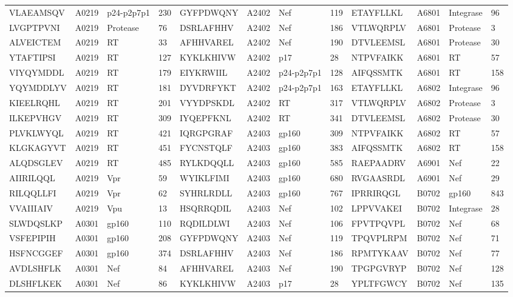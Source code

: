 \begin{table}[htp]
\begin{center}
\begin{sideways}
{\begin{tabulary}{1.5\textwidth}{|l|l|l|l|l|l|l|l|l|l|l|l|}
VLAEAMSQV & A0219 & p24-p2p7p1 & 230 & GYFPDWQNY & A2402 & Nef & 119 & ETAYFLLKL & A6801 & Integrase & 96 \\
LVGPTPVNI & A0219 & Protease & 76 & DSRLAFHHV & A2402 & Nef & 186 & VTLWQRPLV & A6801 & Protease & 3 \\
ALVEICTEM & A0219 & RT & 33 & AFHHVAREL & A2402 & Nef & 190 & DTVLEEMSL & A6801 & Protease & 30 \\
YTAFTIPSI & A0219 & RT & 127 & KYKLKHIVW & A2402 & p17 & 28 & NTPVFAIKK & A6801 & RT & 57 \\
VIYQYMDDL & A0219 & RT & 179 & EIYKRWIIL & A2402 & p24-p2p7p1 & 128 & AIFQSSMTK & A6801 & RT & 158 \\
YQYMDDLYV & A0219 & RT & 181 & DYVDRFYKT & A2402 & p24-p2p7p1 & 163 & ETAYFLLKL & A6802 & Integrase & 96 \\
KIEELRQHL & A0219 & RT & 201 & VYYDPSKDL & A2402 & RT & 317 & VTLWQRPLV & A6802 & Protease & 3 \\
ILKEPVHGV & A0219 & RT & 309 & IYQEPFKNL & A2402 & RT & 341 & DTVLEEMSL & A6802 & Protease & 30 \\
PLVKLWYQL & A0219 & RT & 421 & IQRGPGRAF & A2403 & gp160 & 309 & NTPVFAIKK & A6802 & RT & 57 \\
KLGKAGYVT & A0219 & RT & 451 & FYCNSTQLF & A2403 & gp160 & 383 & AIFQSSMTK & A6802 & RT & 158 \\
ALQDSGLEV & A0219 & RT & 485 & RYLKDQQLL & A2403 & gp160 & 585 & RAEPAADRV & A6901 & Nef & 22 \\
AIIRILQQL & A0219 & Vpr & 59 & WYIKLFIMI & A2403 & gp160 & 680 & RVGAASRDL & A6901 & Nef & 29 \\
RILQQLLFI & A0219 & Vpr & 62 & SYHRLRDLL & A2403 & gp160 & 767 & IPRRIRQGL & B0702 & gp160 & 843 \\
VVAIIIAIV & A0219 & Vpu & 13 & HSQRRQDIL & A2403 & Nef & 102 & LPPVVAKEI & B0702 & Integrase & 28 \\
SLWDQSLKP & A0301 & gp160 & 110 & RQDILDLWI & A2403 & Nef & 106 & FPVTPQVPL & B0702 & Nef & 68 \\
VSFEPIPIH & A0301 & gp160 & 208 & GYFPDWQNY & A2403 & Nef & 119 & TPQVPLRPM & B0702 & Nef & 71 \\
HSFNCGGEF & A0301 & gp160 & 374 & DSRLAFHHV & A2403 & Nef & 186 & RPMTYKAAV & B0702 & Nef & 77 \\
AVDLSHFLK & A0301 & Nef & 84 & AFHHVAREL & A2403 & Nef & 190 & TPGPGVRYP & B0702 & Nef & 128 \\
DLSHFLKEK & A0301 & Nef & 86 & KYKLKHIVW & A2403 & p17 & 28 & YPLTFGWCY & B0702 & Nef & 135 \\

\end{tabulary}}
\end{sideways}
\end{center}
\end{table}
